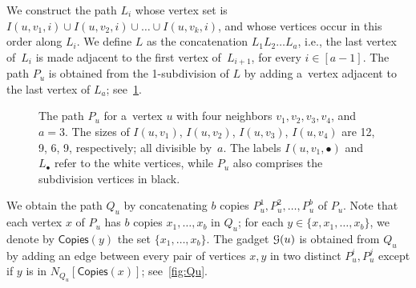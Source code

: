 \documentclass[a4paper,UKenglish,cleveref,hyperref,autoref]{lipics-v2021}
\begin{document}
We construct the path $L_i$ whose vertex set is $I(u, v_1, i) \cup I(u, v_2, i) \cup \dots \cup I(u, v_k, i)$, and whose vertices occur in this order along $L_i$.
We define $L$ as the concatenation $L_1 L_2\dots L_a$, i.e., the last vertex of~$L_i$ is made adjacent to the first vertex of~$L_{i+1}$, for every $i \in [a-1]$.
The path $P_u$ is obtained from the 1-subdivision of $L$ by adding a~vertex adjacent to the last vertex of $L_a$; see~\cref{fig:Pu}.

\begin{figure}[h!]
  \centering
  \caption{The path $P_u$ for a~vertex $u$ with four neighbors $v_1, v_2, v_3, v_4$, and $a = 3$.
    The sizes of $I(u,v_1)$, $I(u,v_2)$, $I(u,v_3)$, $I(u,v_4)$ are 12, 9, 6, 9, respectively; all divisible by~$a$.
    The labels $I(u,v_1,\bullet)$ and $L_{\bullet}$ refer to the white vertices, while $P_u$ also comprises the subdivision vertices in black.}
  \label{fig:Pu}
\end{figure}

\def\copies{\mathsf{Copies}}

We obtain the path $Q_u$ by concatenating $b$ copies  $P_u^1,P_u^2, \dots, P_u^b$ of $P_u$. 
Note that each vertex $x$ of $P_u$ has $b$ copies $x_1,\dots,x_b$ in $Q_u$; for each $y\in \{x,x_1,\dots,x_b\}$, we denote by $\copies(y)$ the set $\{x_1,\dots,x_b\}$.
The gadget $\mathcal G(u)$ is obtained from $Q_u$ by adding an edge between every pair of vertices $x, y$ in two distinct $P_u^i, P_u^j$ except if $y$ is in $N_{Q_u}[\copies(x)]$; see~\cref{fig:Qu}.
\end{document}
